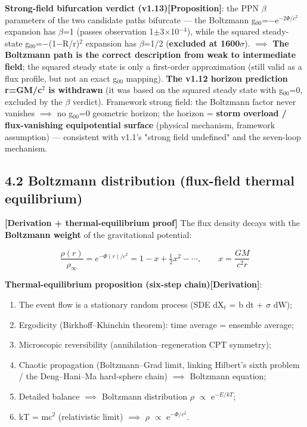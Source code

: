 \documentclass[12pt]{article}
\newcommand{\mtag}[1]{\textbf{[#1]}}
\newcommand{\up}[1]{\ensuremath{^{#1}}}
\newcommand{\down}[1]{\ensuremath{_{#1}}}
\begin{document}
\textbf{Strong-field bifurcation verdict (v1.13)}\mtag{Proposition}: the PPN \ensuremath{\beta} parameters of the two candidate paths bifurcate --- the Boltzmann g\down{00}=\ensuremath{-}e\up{-2\Phi{}/c^{2}} expansion has \ensuremath{\beta}=1 (passes observation 1\ensuremath{\pm}3\ensuremath{\times}10\up{-4}), while the squared steady-state g\down{00}=\ensuremath{-}(1\ensuremath{-}R/r)\up{2} expansion has \ensuremath{\beta}=1/2 (\textbf{excluded at 1600\ensuremath{\sigma}}). \ensuremath{\implies} \textbf{The Boltzmann path is the correct description from weak to intermediate field}; the squared steady state is only a first-order approximation (still valid as a flux profile, but not an exact g\down{00} mapping). \textbf{The v1.12 horizon prediction r=GM/c\up{2} is withdrawn} (it was based on the squared steady state with g\down{00}=0, excluded by the \ensuremath{\beta} verdict). Framework strong field: the Boltzmann factor never vanishes \ensuremath{\implies} no g\down{00}=0 geometric horizon; the horizon = \textbf{storm overload / flux-vanishing equipotential surface} (physical mechanism, framework assumption) --- consistent with v1.1's "strong field undefined" and the seven-loop mechanism.

\subsection{4.2 Boltzmann distribution (flux-field thermal equilibrium)}

\mtag{Derivation + thermal-equilibrium proof} The flux density decays with the \textbf{Boltzmann weight} of the gravitational potential:

\[\frac{\rho(r)}{\rho_\infty} = e^{-\Phi(r)/c^2} = 1 - x + \tfrac12 x^2 - \cdots,\qquad x = \frac{GM}{c^2 r}\]

\textbf{Thermal-equilibrium proposition (six-step chain)}\mtag{Derivation}:
\begin{enumerate}
\item The event flow is a stationary random process (SDE dX\down{t} = b dt + \ensuremath{\sigma} dW);
\item Ergodicity (Birkhoff--Khinchin theorem): time average = ensemble average;
\item Microscopic reversibility (annihilation--regeneration CPT symmetry);
\item Chaotic propagation (Boltzmann--Grad limit, linking Hilbert's sixth problem / the Deng--Hani--Ma hard-sphere chain) \ensuremath{\implies} Boltzmann equation;
\item Detailed balance \ensuremath{\implies} Boltzmann distribution \ensuremath{\rho} \ensuremath{\propto} e\up{-E/kT};
\item kT = mc\up{2} (relativistic limit) \ensuremath{\implies} \ensuremath{\rho} \ensuremath{\propto} e\up{-\Phi{}/c^{2}}.
\end{enumerate}
\end{document}
